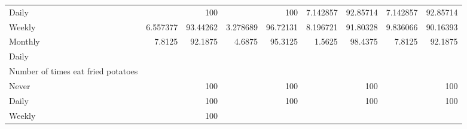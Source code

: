 \documentclass{article}
\begin{document}
\begin{tabular}{lllllllll}
\multicolumn{1}{l}{\hspace{5em}Daily} &
  \multicolumn{1}{|r}{} &
  \multicolumn{1}{r}{100} &
  \multicolumn{1}{r}{} &
  \multicolumn{1}{r}{100} &
  \multicolumn{1}{r}{7.142857} &
  \multicolumn{1}{r}{92.85714} &
  \multicolumn{1}{r}{7.142857} &
  \multicolumn{1}{r}{92.85714} \\
\multicolumn{1}{l}{\hspace{5em}Weekly} &
  \multicolumn{1}{|r}{6.557377} &
  \multicolumn{1}{r}{93.44262} &
  \multicolumn{1}{r}{3.278689} &
  \multicolumn{1}{r}{96.72131} &
  \multicolumn{1}{r}{8.196721} &
  \multicolumn{1}{r}{91.80328} &
  \multicolumn{1}{r}{9.836066} &
  \multicolumn{1}{r}{90.16393} \\
\multicolumn{1}{l}{\hspace{5em}Monthly} &
  \multicolumn{1}{|r}{7.8125} &
  \multicolumn{1}{r}{92.1875} &
  \multicolumn{1}{r}{4.6875} &
  \multicolumn{1}{r}{95.3125} &
  \multicolumn{1}{r}{1.5625} &
  \multicolumn{1}{r}{98.4375} &
  \multicolumn{1}{r}{7.8125} &
  \multicolumn{1}{r}{92.1875} \\
\multicolumn{1}{l}{\hspace{3em}Daily} &
  \multicolumn{1}{|r}{} &
  \multicolumn{1}{r}{} &
  \multicolumn{1}{r}{} &
  \multicolumn{1}{r}{} &
  \multicolumn{1}{r}{} &
  \multicolumn{1}{r}{} &
  \multicolumn{1}{r}{} &
  \multicolumn{1}{r}{} \\
\multicolumn{1}{l}{\hspace{4em}Number of times eat fried potatoes} &
  \multicolumn{1}{|r}{} &
  \multicolumn{1}{r}{} &
  \multicolumn{1}{r}{} &
  \multicolumn{1}{r}{} &
  \multicolumn{1}{r}{} &
  \multicolumn{1}{r}{} &
  \multicolumn{1}{r}{} &
  \multicolumn{1}{r}{} \\
\multicolumn{1}{l}{\hspace{5em}Never} &
  \multicolumn{1}{|r}{} &
  \multicolumn{1}{r}{100} &
  \multicolumn{1}{r}{} &
  \multicolumn{1}{r}{100} &
  \multicolumn{1}{r}{} &
  \multicolumn{1}{r}{100} &
  \multicolumn{1}{r}{} &
  \multicolumn{1}{r}{100} \\
\multicolumn{1}{l}{\hspace{5em}Daily} &
  \multicolumn{1}{|r}{} &
  \multicolumn{1}{r}{100} &
  \multicolumn{1}{r}{} &
  \multicolumn{1}{r}{100} &
  \multicolumn{1}{r}{} &
  \multicolumn{1}{r}{100} &
  \multicolumn{1}{r}{} &
  \multicolumn{1}{r}{100} \\
\multicolumn{1}{l}{\hspace{5em}Weekly} &
  \multicolumn{1}{|r}{} &
  \multicolumn{1}{r}{100} &
  \multicolumn{1}{r}{} &

\end{tabular}
\end{document}
